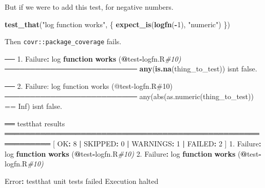 \documentclass[
]{article}
\newenvironment{Shaded}{\begin{snugshade}}{\end{snugshade}}
\newcommand{\CommentTok}[1]{\textcolor[rgb]{0.56,0.35,0.01}{\textit{#1}}}
\newcommand{\ControlFlowTok}[1]{\textcolor[rgb]{0.13,0.29,0.53}{\textbf{#1}}}
\newcommand{\DecValTok}[1]{\textcolor[rgb]{0.00,0.00,0.81}{#1}}
\newcommand{\FloatTok}[1]{\textcolor[rgb]{0.00,0.00,0.81}{#1}}
\newcommand{\KeywordTok}[1]{\textcolor[rgb]{0.13,0.29,0.53}{\textbf{#1}}}
\newcommand{\NormalTok}[1]{#1}
\newcommand{\OperatorTok}[1]{\textcolor[rgb]{0.81,0.36,0.00}{\textbf{#1}}}
\newcommand{\StringTok}[1]{\textcolor[rgb]{0.31,0.60,0.02}{#1}}
\begin{document}
But if we were to add this test, for negative numbers.

\begin{Shaded}
\begin{Highlighting}[]
\KeywordTok{test\_that}\NormalTok{(}\StringTok{"log function works"}\NormalTok{, \{}
  \KeywordTok{expect\_is}\NormalTok{(}\KeywordTok{logfn}\NormalTok{(}\OperatorTok{{-}}\DecValTok{1}\NormalTok{), }\StringTok{"numeric"}\NormalTok{)}
\NormalTok{\})}
\end{Highlighting}
\end{Shaded}

Then \texttt{covr::package\_coverage} fails.

\begin{Shaded}
\begin{Highlighting}[]
\NormalTok{── }\FloatTok{1.}\NormalTok{ Failure}\OperatorTok{:}\StringTok{ }\NormalTok{log }\ControlFlowTok{function} \KeywordTok{works}\NormalTok{ (}\OperatorTok{@}\NormalTok{test}\OperatorTok{{-}}\NormalTok{logfn.R}\CommentTok{\#10)  ──────────────────────────}
\KeywordTok{any}\NormalTok{(}\KeywordTok{is.na}\NormalTok{(thing\_to\_test)) isn}\StringTok{\textquotesingle{}t false.}

\StringTok{── 2. Failure: log function works (@test{-}logfn.R\#10)  ──────────────────────────}
\StringTok{any(abs(as.numeric(thing\_to\_test)) == Inf) isn\textquotesingle{}}\NormalTok{t false.}

\NormalTok{══ testthat results  ═══════════════════════════════════════════════════════════}
\NormalTok{[ OK}\OperatorTok{:}\StringTok{ }\DecValTok{8} \OperatorTok{|}\StringTok{ }\NormalTok{SKIPPED}\OperatorTok{:}\StringTok{ }\DecValTok{0} \OperatorTok{|}\StringTok{ }\NormalTok{WARNINGS}\OperatorTok{:}\StringTok{ }\DecValTok{1} \OperatorTok{|}\StringTok{ }\NormalTok{FAILED}\OperatorTok{:}\StringTok{ }\DecValTok{2}\NormalTok{ ]}
\FloatTok{1.}\NormalTok{ Failure}\OperatorTok{:}\StringTok{ }\NormalTok{log }\ControlFlowTok{function} \KeywordTok{works}\NormalTok{ (}\OperatorTok{@}\NormalTok{test}\OperatorTok{{-}}\NormalTok{logfn.R}\CommentTok{\#10) }
\FloatTok{2.}\NormalTok{ Failure}\OperatorTok{:}\StringTok{ }\NormalTok{log }\ControlFlowTok{function} \KeywordTok{works}\NormalTok{ (}\OperatorTok{@}\NormalTok{test}\OperatorTok{{-}}\NormalTok{logfn.R}\CommentTok{\#10) }

\NormalTok{Error}\OperatorTok{:}\StringTok{ }\NormalTok{testthat unit tests failed}
\NormalTok{Execution halted}
\end{Highlighting}
\end{Shaded}
\end{document}
